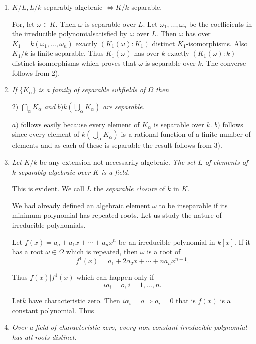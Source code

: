 \begin{enumerate}[1)]
\item $K/L, L/k$ separably algebraic $\Leftrightarrow K/k$ separable. 

For, let $\omega \in K$. Then $\omega$ is separable over $L$. Let
$\omega_1 ,\ldots , \omega_n$ be the coefficients in the irreducible
polynomial\pageoriginale satisfied by $\omega$ over $L$. Then $\omega$
has over $K_1 = k (\omega_1 ,\ldots ,\omega_n)$ exactly $(K_1 (\omega)
: K_1)$ distinct $K_1$-isomorphisms. Also $K_1/k$ is finite
separable. Thus $K_1 (\omega)$ has over $k$ exactly $(K_1(\omega) :
k)$ distinct isomorphisms which proves that $\omega$ is separable over
$k$. The converse follows from 2).  

\item \textit{If $\{ K_\alpha \}$ is a family of separable subfields
  of $\Omega$ then} 

$2)$ $\bigcap\limits _{\alpha} K_{\alpha}$ \textit{ and } $b)
  k(\bigcup\limits_{\alpha} K_\alpha )$ \textit{are separable.} 

$a)$ follows easily because every element of $K_\alpha$ is separable
  over $k$. $b)$ follows since every element of $k
  (\bigcup\limits_\alpha K_\alpha)$ is a rational function of a finite
  number of elements and as each of these is separable the result
  follows from 3). 

\item \textit{Let} $K/k$ be any extension-not necessarily
  algebraic.\textit{ The set $L$ of elements of $k$ separably
    algebraic over $K$ is a field}. 

This is evident. We call $L$ the \textit{separable closure} of $k$ in
$K$.  

We had already defined an algebraic element $\omega$ to be inseparable
if its minimum polynomial has repeated roots. Let us study the nature
of irreducible polynomials. 

Let $f (x) = a_o + a_1 x + \cdots + a_n x^n$ be an irreducible
polynomial in $k[ x ]$. If it has a root $\omega \in \Omega$ which is
repeated, then $\omega$ is a root of  
$$
f^1 (x) = a_1 + 2a_2 x + \cdots + n a_n x^{n-1}.
$$

Thus $f (x) | f^1 (x)$ which can happen only if
$$
i a_i = o, i = 1, \ldots , n.
$$

Let\pageoriginale $k$ have characteristic zero. Then $i a_i = o
\Rightarrow a_i = 0$ that is $f(x)$ is a constant polynomial. Thus   

\item \textit{Over a field of characteristic zero, every non constant
  irreducible polynomial has all roots distinct.} 


\end{enumerate}
